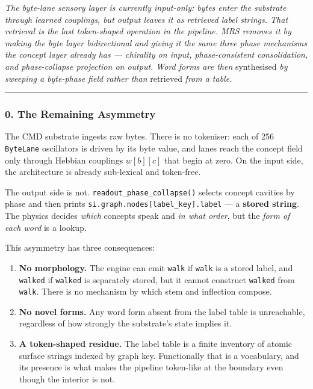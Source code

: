 \documentclass[
  11pt,
  a4paper,
]{article}
\providecommand{\tightlist}{%
  \setlength{\itemsep}{0pt}\setlength{\parskip}{0pt}}
\begin{document}
\emph{The byte-lane sensory layer is currently input-only: bytes enter
the substrate through learned couplings, but output leaves it as
retrieved label strings. That retrieval is the last token-shaped
operation in the pipeline. MRS removes it by making the byte layer
bidirectional and giving it the same three phase mechanisms the concept
layer already has --- chirality on input, phase-consistent
consolidation, and phase-collapse projection on output. Word forms are
then} synthesised \emph{by sweeping a byte-phase field rather than}
retrieved \emph{from a table.}

\begin{center}\rule{0.5\linewidth}{0.5pt}\end{center}

\subsubsection{0. The Remaining
Asymmetry}\label{the-remaining-asymmetry}

The CMD substrate ingests raw bytes. There is no tokeniser: each of 256
\texttt{ByteLane} oscillators is driven by its byte value, and lanes
reach the concept field only through Hebbian couplings \(w[b][c]\) that
begin at zero. On the input side, the architecture is already
sub-lexical and token-free.

The output side is not. \texttt{readout\_phase\_collapse()} selects
concept cavities by phase and then prints
\texttt{si.graph.nodes{[}label\_key{]}.label} --- a \textbf{stored
string}. The physics decides \emph{which} concepts speak and \emph{in
what order}, but the \emph{form of each word} is a lookup.

This asymmetry has three consequences:

\begin{enumerate}
\def\labelenumi{\arabic{enumi}.}
\tightlist
\item
  \textbf{No morphology.} The engine can emit \texttt{walk} if
  \texttt{walk} is a stored label, and \texttt{walked} if
  \texttt{walked} is separately stored, but it cannot construct
  \texttt{walked} from \texttt{walk}. There is no mechanism by which
  stem and inflection compose.
\item
  \textbf{No novel forms.} Any word form absent from the label table is
  unreachable, regardless of how strongly the substrate's state implies
  it.
\item
  \textbf{A token-shaped residue.} The label table is a finite inventory
  of atomic surface strings indexed by graph key. Functionally that is a
  vocabulary, and its presence is what makes the pipeline token-like at
  the boundary even though the interior is not.
\end{enumerate}
\end{document}
